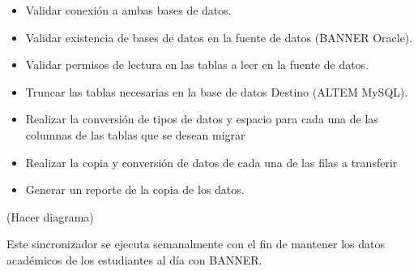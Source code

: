 \begin{itemize}
    \item Validar conexión a ambas bases de datos.
    \item Validar existencia de bases de datos en la fuente de datos (BANNER Oracle).
    \item Validar permisos de lectura en las tablas a leer en la fuente de datos.
    \item Truncar las tablas necesarias en la base de datos Destino (ALTEM MySQL).
    \item Realizar la conversión de tipos de datos y espacio para cada una de las columnas de las tablas que se desean migrar
    \item Realizar la copia y conversión de datos de cada una de las filas a transferir
    \item Generar un reporte de la copia de los datos.
\end{itemize}

(Hacer diagrama)

Este sincronizador se ejecuta semanalmente con el fin de mantener los datos académicos de los estudiantes al día con BANNER.